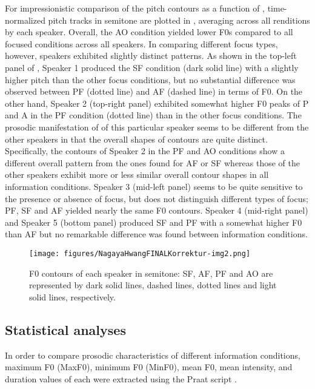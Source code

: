 \documentclass[output=paper]{langsci/langscibook}
\begin{document}
\noindent
For impressionistic comparison of the pitch contours as a function of , time-normalized pitch tracks in semitone are plotted in , averaging across all renditions by each speaker. Overall, the AO condition yielded lower F0s compared to all focused conditions across all speakers. In comparing different focus types, however, speakers exhibited slightly distinct patterns. As shown in the top-left panel of , Speaker 1 produced the SF condition (dark solid line) with a slightly higher pitch than the other focus conditions, but no substantial difference was observed between PF (dotted line) and AF (dashed line) in terms of F0. On the other hand, Speaker 2 (top-right panel) exhibited somewhat higher F0 peaks of P and A in the PF condition (dotted line) than in the other focus conditions. The prosodic manifestation of  of this particular speaker seems to be different from the other speakers in that the overall shapes of contours are quite distinct. Specifically, the contours of Speaker 2 in the PF and AO conditions show a different overall pattern from the ones found for AF or SF whereas those of the other speakers exhibit more or less similar overall contour shapes in all information conditions. Speaker 3 (mid-left panel) seems to be quite sensitive to the presence or absence of focus, but does not distinguish different types of focus; PF, SF and AF yielded nearly the same F0 contours. Speaker 4 (mid-right panel) and Speaker 5 (bottom panel) produced SF and PF with a somewhat higher F0 than AF but no remarkable difference was found between information conditions.

\begin{figure}[H]
	\texttt{[image: figures/NagayaHwangFINALKorrektur-img2.png]}
	\caption{F0 contours of each speaker in semitone: SF, AF, PF and AO are represented by dark solid lines, dashed lines, dotted lines and light solid lines, respectively.}
	\label{fig:nagaya:1}
\end{figure}

\subsection{\label{s:nagaya:3.2}Statistical analyses}

In order to compare prosodic characteristics of different information conditions, maximum F0 (MaxF0), minimum F0 (MinF0), mean F0, mean intensity, and duration values of each  were extracted using the Praat script  \citep{Xu2013}.
\end{document}
